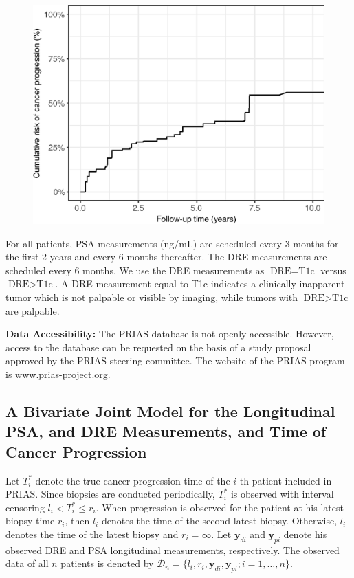 \documentclass[a4paper, 12pt]{article}
\begin{document}


\begin{figure}[!htb]
\captionsetup{justification=justified}
\centerline{\includegraphics[width=\columnwidth]{Figure2.eps}}

\label{Figure2}
\end{figure}

For all patients, PSA measurements (ng/mL) are scheduled every 3 months for the first 2 years and every 6 months thereafter. The DRE measurements are scheduled every 6 months. We use the DRE measurements as ${\mbox{DRE} = \mbox{T1c}}$ versus $\mbox{DRE} > \mbox{T1c}$. A DRE measurement equal to T1c \citep{schroder1992tnm} indicates a clinically inapparent tumor which is not palpable or visible by imaging, while tumors with $\mbox{DRE} > \mbox{T1c}$ are palpable.

\textbf{Data Accessibility:} The PRIAS database is not openly accessible. However, access to the database can be requested on the basis of a study proposal approved by the PRIAS steering committee. The website of the PRIAS program is \url{www.prias-project.org}.

\subsection{A Bivariate Joint Model for the Longitudinal PSA, and DRE Measurements, and Time of Cancer Progression}
Let $T_i^*$ denote the true cancer progression time of the ${i\mbox{-th}}$ patient included in PRIAS. Since biopsies are conducted periodically, $T_i^*$ is observed with interval censoring ${l_i < T_i^* \leq r_i}$. When progression is observed for the patient at his latest biopsy time $r_i$, then $l_i$ denotes the time of the second latest biopsy. Otherwise, $l_i$ denotes the time of the latest biopsy and ${r_i=\infty}$. Let $\boldsymbol{y}_{di}$ and $\boldsymbol{y}_{pi}$ denote his observed DRE and PSA longitudinal measurements, respectively. The observed data of all $n$ patients is denoted by ${\mathcal{D}_n = \{l_i, r_i, \boldsymbol{y}_{di}, \boldsymbol{y}_{pi}; i = 1, \ldots, n\}}$.
\end{document}
